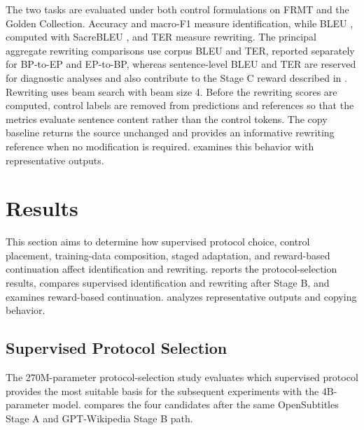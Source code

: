 \documentclass[acmtog,nonacm]{acmart}
\begin{document}
The two tasks are evaluated under both control formulations on FRMT and the
Golden Collection. Accuracy and macro-F1 measure identification, while BLEU
\citep{papineni2002bleu}, computed with SacreBLEU \citep{post-2018-call}, and
TER \citep{snover2006study} measure rewriting. The principal aggregate
rewriting comparisons use corpus BLEU and TER, reported separately for BP-to-EP
and EP-to-BP, whereas sentence-level BLEU and TER are reserved for diagnostic
analyses and also contribute to the Stage C reward described in
. Rewriting uses beam search with beam size 4.
Before the rewriting scores are computed, control labels are removed from
predictions and references so that the metrics evaluate sentence content
rather than the control tokens. The copy baseline returns the source unchanged
and provides an informative rewriting reference when no modification is
required.  examines this behavior with
representative outputs.

\section{Results}
\label{sec:results}

This section aims to determine how supervised protocol choice, control
placement, training-data composition, staged adaptation, and reward-based
continuation affect identification and rewriting.
 reports the protocol-selection
results,  compares supervised identification
and rewriting after Stage B, and 
examines reward-based continuation.  analyzes
representative outputs and copying behavior.

\subsection{Supervised Protocol Selection}
\label{sec:supervised-protocol-selection}

The 270M-parameter protocol-selection study evaluates which supervised protocol
provides the most suitable basis for the subsequent experiments with the
4B-parameter model. 
compares the four candidates after the same OpenSubtitles Stage A and
GPT-Wikipedia Stage B path.
\end{document}
